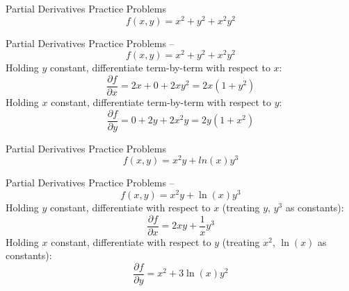 \documentclass[aspectratio=169]{beamer}
\begin{document}
\begin{frame}{Partial Derivatives Practice Problems}\label{main1}
	\vspace{-4cm}
     \[
    f(x,y) = x^{2} + y^{2} + x^{2}y^{2}
    \]
\end{frame}

\begin{frame}{Partial Derivatives Practice Problems -- }\label{main1}
	\vspace{-1cm}
     \[
    f(x,y) = x^{2} + y^{2} + x^{2}y^{2}
    \]
    \vspace{0.5em}
    Holding $y$ constant, differentiate term-by-term with respect to $x$:
    \[
    \frac{\partial f}{\partial x} = 2x + 0 + 2xy^2 = 2x(1+y^2)
    \]
    \vspace{0.5em}
    Holding $x$ constant, differentiate term-by-term with respect to $y$:
    \[
    \frac{\partial f}{\partial y} = 0 + 2y + 2x^2y = 2y(1+x^2)
    \]
\end{frame}

\begin{frame}{Partial Derivatives Practice Problems}\label{main1}
	\vspace{-4cm}
     \[
    f(x,y) = x^{2}y+ln(x)y^{3}
    \]
\end{frame}

\begin{frame}{Partial Derivatives Practice Problems -- }\label{main1}
	\vspace{-1cm}
     \[
    f(x,y) = x^{2}y+\ln(x)y^{3}
    \]
    \vspace{0.5em}
    Holding $y$ constant, differentiate with respect to $x$ (treating $y$, $y^3$ as constants):
    \[
    \frac{\partial f}{\partial x} = 2xy + \frac{1}{x}y^3
    \]
    \vspace{0.5em}
    Holding $x$ constant, differentiate with respect to $y$ (treating $x^2$, $\ln(x)$ as constants):
    \[
    \frac{\partial f}{\partial y} = x^2 + 3\ln(x)y^2
    \]
\end{frame}
\end{document}
